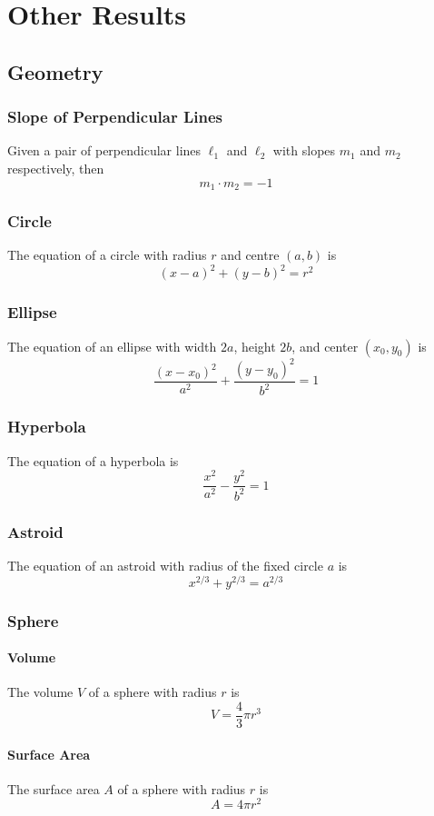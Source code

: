 \documentclass[../ma2002_notes.tex]{subfiles}
\begin{document}
\section{Other Results}
\subsection{Geometry}
\subsubsection{Slope of Perpendicular Lines}
Given a pair of perpendicular lines \(\ell_1\) and \(\ell_2\) with slopes \(m_1\) and \(m_2\) respectively, then
\[m_1\cdot m_2=-1\]

\subsubsection{Circle}
The equation of a circle with radius \(r\) and centre \((a,b)\) is
\[(x-a)^2+(y-b)^2=r^2\]

\subsubsection{Ellipse}
The equation of an ellipse with width \(2a\), height \(2b\), and center \((x_0,y_0)\) is
\[\frac{(x-x_0)^2}{a^2}+\frac{(y-y_0)^2}{b^2}=1\]

\subsubsection{Hyperbola}
The equation of a hyperbola is
\[\frac{x^2}{a^2}-\frac{y^2}{b^2}=1\]

\subsubsection{Astroid}
The equation of an astroid with radius of the fixed circle \(a\) is
\[x^{2/3}+y^{2/3}=a^{2/3}\]

\subsubsection{Sphere}
\paragraph{Volume}
The volume \(V\) of a sphere with radius \(r\) is
\[V=\frac{4}{3}\pi r^3\]

\paragraph{Surface Area}
The surface area \(A\) of a sphere with radius \(r\) is
\[A=4\pi r^2\]
\end{document}
